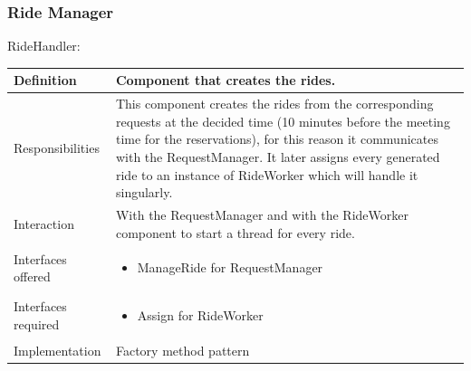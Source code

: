 \documentclass[a4paper,11pt]{report} %
\begin{document}
	\subsubsection{Ride Manager}
	\begin{minipage}{\linewidth}
	\end{minipage} \linebreak
	\centerline{RideHandler:}
	\begin{center}
		\begin{tabular}{| l | p{9cm} |}\hline
			Definition & Component that creates the rides.\\\hline
			Responsibilities & This component creates the rides from the corresponding requests at the decided time (10 minutes before the meeting time for the reservations), for this reason it communicates with the RequestManager. It later assigns every generated ride to an instance of RideWorker which will handle it singularly.\\\hline
			Interaction & With the RequestManager and with the RideWorker component to start a thread for every ride.\\\hline
			Interfaces offered & \begin{itemize}
				\item ManageRide for RequestManager
			\end{itemize}\\\hline
			Interfaces required & \begin{itemize}
				\item Assign for RideWorker
			\end{itemize}\\\hline
			Implementation & Factory method pattern\\\hline
		\end{tabular}
	\end{center}
	
\end{document}
